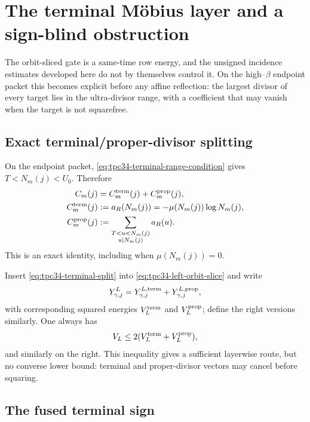 \section{The terminal M\"obius layer and a sign-blind obstruction}
\label{sec:tpc34-terminal-barrier}

The orbit-sliced gate is a same-time row energy, and the unsigned
incidence estimates developed here do not by themselves control it.  On
the high--\(\beta\) endpoint packet this becomes explicit before any
affine reflection: the largest divisor of every target lies in the
ultra-divisor range, with a coefficient that may vanish when the target
is not squarefree.

\subsection{Exact terminal/proper-divisor splitting}

On the endpoint packet, \eqref{eq:tpc34-terminal-range-condition} gives
\(T<N_m(j)<U_0\).  Therefore
\begin{align}
 C_m(j)
 &=C_m^{\rm term}(j)+C_m^{\rm prop}(j),
 \label{eq:tpc34-terminal-split}\\
 C_m^{\rm term}(j)
 &:=
 a_R(N_m(j))
 =-\mu(N_m(j))\log N_m(j),
 \label{eq:tpc34-terminal-term}\\
 C_m^{\rm prop}(j)
 &:=
 \sum_{\substack{T<u<N_m(j)\\u\mid N_m(j)}}a_R(u).
 \label{eq:tpc34-proper-term}
\end{align}
This is an exact identity, including when \(\mu(N_m(j))=0\).

Insert \eqref{eq:tpc34-terminal-split} into
\eqref{eq:tpc34-left-orbit-slice} and write
\begin{equation}
 Y_{\gamma,j}^L
 =Y_{\gamma,j}^{L,\rm term}
 +Y_{\gamma,j}^{L,\rm prop},
 \label{eq:tpc34-Y-terminal-split}
\end{equation}
with corresponding squared energies \(V_L^{\rm term}\) and
\(V_L^{\rm prop}\); define the right versions similarly.  One always has
\begin{equation}
 V_L\le2(V_L^{\rm term}+V_L^{\rm prop}),
 \label{eq:tpc34-terminal-triangle}
\end{equation}
and similarly on the right.  This inequality gives a sufficient
layerwise route, but no converse lower bound: terminal and proper-divisor
vectors may cancel before squaring.

\subsection{The fused terminal sign}

